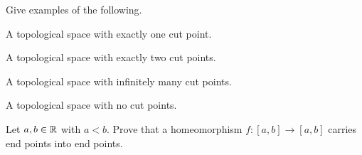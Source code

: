 \item Give examples of the following.
\ba
\item A topological space with exactly one cut point.

\item A topological space with exactly two cut points.

\item A topological space with infinitely many cut points.
 
\item A topological space with no cut points.

\ea

\begin{comment}

\ExerciseSolution

\ba
\item Consider $X$ as a subset of $\R^2$ to be the set consisting of two loops that are tangent at point $a$. No point on either loop, except $a$ is a cut point. However, $X \setminus \{a\}$ is a disconnected union of two circles minus a point. 

\item Consider $X$ as a collection of three loops $L_1$, $L_2$, and $L_3$ such that $L_1$ and $L_2$ are tangent at point $a$, $L_2$ and $L_3$ are tangent at point $b$, and $L_1$ and $L_3$ do not intersect. As in part (a), the only cut points are the points of tangency.

\item Consider a line segment. Every point, except the endpoints, is a cut point. 
 
\item A circle has no cut points. 

\ea

\end{comment}


\item Let $a, b \in \mathbb{R}$ with $a < b$. Prove that a homeomorphism $f: [a,b] \to [a,b]$ carries end points into end points. 

\begin{comment}

\ExerciseSolution Let $a,b \in \R$ with $a < b$. Let $A = [a,b]$, and let $f: A to A$ be a homeomorphism. Notice that if $a < c < b$ for some real number $c$, then $A \setminus \{c\} = [a,c) \cup (c,b]$ and $A \setminus \{c\}$ is disconnected. Thus, every $c$ strictly between $a$ and $b$ is a cut point of $A$. Note also that $A \setminus \{a\} = (a,b]$ and $A \setminus \{b\} = [a,b)$, and $A \setminus \{a\}$ and $A \setminus \{b\}$ are intervals. So  $A \setminus \{a\}$ and $A \setminus \{b\}$ are connected. Thus, $a$ and $b$ are not cut points of $A$. Since a homeomorphism must preserve cut points, it follows that $f(a)$ must be either $a$ or $b$ and $f(b)$ must be either $a$ or $b$. Thus, $f$ sends endpoints to endpoints. 


\end{comment}


